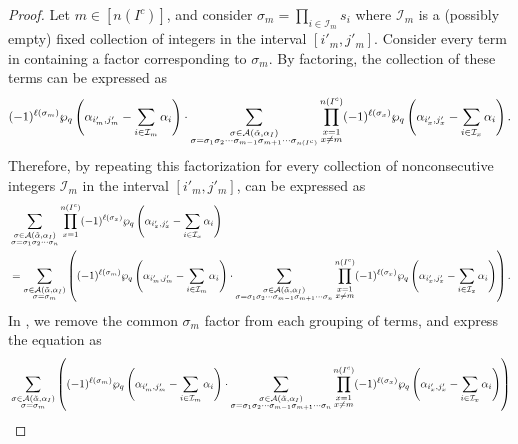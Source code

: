 \documentclass[10pt]{article}
\newcommand{\hr}[0]{\Tilde{\alpha}}
\newcommand{\newmu}[0]{\alpha_I}
\newcommand{\thealtset}[0]{\mathcal{A}(\hr,\newmu)}
\newcommand{\qpartition}[1]{\wp_q\left(#1\right)}
\begin{document}
\begin{proof}
    Let $m\in[n(I^c)]$, and consider $\sigma_m=\prod_{i\in\mathcal{I}_m}s_i$ where $\mathcal{I}_m$ is a (possibly empty) fixed collection of integers in the interval $[i'_m,j'_m]$. Consider every term in  containing a factor corresponding to $\sigma_m$. 
    By factoring, the collection of these terms can be expressed as
    \begin{equation}
        (-1)^{\ell(\sigma_m)}\qpartition{\alpha_{i'_m,j'_m}-\sum_{i\in\mathcal{I}_m}\alpha_i}\cdot \sum_{\substack{\sigma\in\thealtset\\ \sigma=\sigma_1\sigma_2\cdots\sigma_{m-1}\sigma_{m+1}\cdots\sigma_{n(I^c)}}}\prod_{\substack{x=1\\x\neq m}}^{n(I^c)} (-1)^{\ell(\sigma_x)}\qpartition{\alpha_{i'_x,j'_x}-\sum_{i\in\mathcal{I}_x}\alpha_i}.
    \end{equation}
    Therefore, by repeating this factorization for every collection of nonconsecutive integers $\mathcal{I}_m$ in the interval $[i'_m,j'_m]$,  can be expressed as
    \begin{align}
        &\sum_{\substack{\sigma\in\mathcal{A}(\hr,\alpha_I) \\ \sigma=\sigma_1\sigma_2\cdots\sigma_n}}\prod_{x=1}^{n(I^c)}(-1)^{\ell(\sigma_x
        )}\qpartition{\alpha_{i'_x,j'_x}-\sum_{i\in\mathcal{I}_x}\alpha_i}\notag \\
        &= \sum_{\substack{\sigma\in\thealtset\\ \sigma=\sigma_m}}\left((-1)^{\ell(\sigma_m)}\qpartition{\alpha_{i'_m,j'_m}-\sum_{i\in\mathcal{I}_m}\alpha_i}\cdot \sum_{\substack{\sigma\in\thealtset\\ \sigma=\sigma_1\sigma_2\cdots \sigma_{m-1}\sigma_{m+1}\cdots\sigma_n}}\prod_{\substack{x=1\\x\neq m}}^{n(I^c)} (-1)^{\ell(\sigma_x)}\qpartition{\alpha_{i'_x,j'_x}-\sum_{i\in\mathcal{I}_x}\alpha_i}\right).\label{eq: KWMF with sigma 1 factored out}
    \end{align}
    In , we remove the common $\sigma_m$ factor from each grouping of terms, and express the equation as
    \begin{align}
        &\sum_{\substack{\sigma\in\thealtset\\ \sigma=\sigma_m}}\left((-1)^{\ell(\sigma_m)}\qpartition{\alpha_{i'_m,j'_m}-\sum_{i\in\mathcal{I}_m}\alpha_i}\cdot \sum_{\substack{\sigma\in\thealtset\\ \sigma=\sigma_1\sigma_2\cdots \sigma_{m-1}\sigma_{m+1}\cdots\sigma_n}}\prod_{\substack{x=1\\x\neq m}}^{n(I^c)} (-1)^{\ell(\sigma_x)}\qpartition{\alpha_{i'_x,j'_x}-\sum_{i\in\mathcal{I}_x}\alpha_i}\right)\notag \\

\end{align}
\end{proof}
\end{document}

